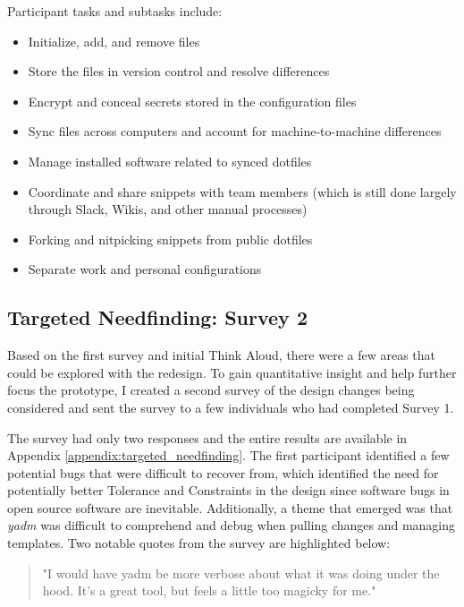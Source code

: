 \documentclass[letterpaper]{jdf}
\begin{document}
 Participant tasks and subtasks include:

\begin{itemize}
	\item Initialize, add, and remove files
	\item Store the files in version control and resolve differences
	\item Encrypt and conceal secrets stored in the configuration files
	\item Sync files across computers and account for machine-to-machine differences
	\item Manage installed software related to synced dotfiles
	\item Coordinate and share snippets with team members (which is still done largely through Slack, Wikis, and other manual processes)
	\item Forking and nitpicking snippets from public dotfiles
	\item Separate work and personal configurations
\end{itemize}

\subsection{Targeted Needfinding: Survey 2}
Based on the first survey and initial Think Aloud, there were a few areas that could be explored with the redesign. To gain quantitative insight and help further focus the prototype, I created a second survey of the design changes being considered and sent the survey to a few individuals who had completed Survey 1.

The survey had only two responses and the entire results are available in Appendix \ref{appendix:targeted_needfinding}. The first participant identified a few potential bugs that were difficult to recover from, which identified the need for potentially better Tolerance and Constraints in the design since software bugs in open source software are inevitable. Additionally, a theme that emerged was that \emph{yadm} was difficult to comprehend and debug when pulling changes and managing templates. Two notable quotes from the survey are highlighted below:

\begin{quotation}
	"I would have yadm be more verbose about what it was doing under the hood. It's a great tool, but feels a little too magicky for me."
\end{quotation}
\end{document}
